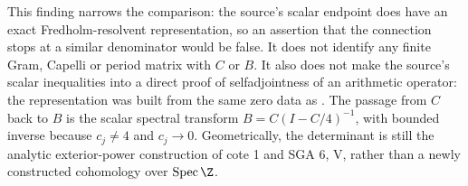 This finding narrows the comparison: the source's scalar endpoint does have an exact Fredholm-resolvent representation, so an assertion that the connection stops at a similar denominator would be false. It does not identify any finite Gram, Capelli or period matrix with $C$ or $B$. It also does not make the source's scalar inequalities into a direct proof of selfadjointness of an arithmetic operator: the representation was built from the same zero data as . The passage from $C$ back to $B$ is the scalar spectral transform $B=C(I-C/4)^{-1}$, with bounded inverse because $c_j\ne4$ and $c_j\to0$. Geometrically, the determinant is still the analytic exterior-power construction of cote 1 and SGA 6, V, rather than a newly constructed cohomology over $\operatorname{Spec}\Z$.
